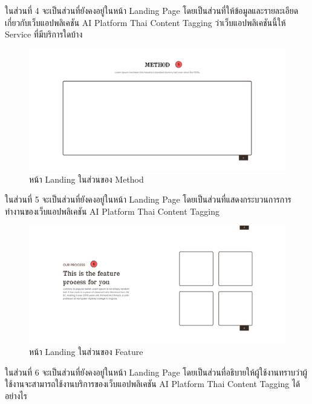 \documentclass[12pt,oneside,openright,a4paper]{cpe-thai-project}
\begin{document}
  \hspace*{1cm}ในส่วนที่ 4 จะเป็นส่วนที่ยังคงอยู่ในหน้า Landing Page โดยเป็นส่วนที่ให้ข้อมูลและรายละเอียดเกี่ยวกับเว็บแอปพลิเคชัน AI Platform Thai Content Tagging
  ว่าเว็บแอปพลิเคชันนี้ให้ Service ที่มีบริการใดบ้าง
  \begin{figure}[!ht]\centering
    \includegraphics[width=14cm]{./img/project_ui/method.png} 
    \caption{หน้า Landing ในส่วนของ Method}\label{fig:method} 
  \end{figure}
  \newline\hspace*{1cm}ในส่วนที่ 5 จะเป็นส่วนที่ยังคงอยู่ในหน้า Landing Page โดยเป็นส่วนที่แสดงกระบวนการการทำงานของเว็บแอปพลิเคชัน AI Platform Thai Content Tagging

  \begin{figure}[!ht]\centering
    \includegraphics[width=13cm]{./img/project_ui/feature.png} 
    \caption{หน้า Landing ในส่วนของ Feature}\label{fig:feature_ui} 
  \end{figure}
  \hspace*{1cm}ในส่วนที่ 6 จะเป็นส่วนที่ยังคงอยู่ในหน้า Landing Page โดยเป็นส่วนที่อธิบายให้ผู้ใช้งานทราบว่าผู้ใช้งานจะสามารถใช้งานบริการของเว็บแอปพลิเคชัน AI Platform Thai Content Tagging
  ได้อย่างไร
\end{document}
